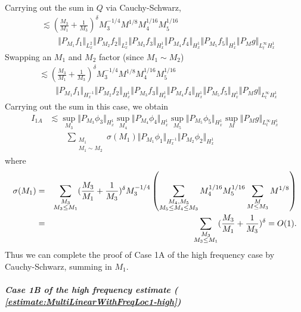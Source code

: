 \documentclass[12pt,letterpaper,leqno]{amsart}
\theoremstyle{plain}
\numberwithin{equation}{section}
\numberwithin{theorem}{section}
\numberwithin{proposition}{section}
\numberwithin{lemma}{section}
\numberwithin{corollary}{section}
\begin{document}
Carrying out the sum in $Q$ via Cauchy-Schwarz, 
\begin{align*}
& \lesssim (\frac{M_{3}}{M_{1}}+\frac{1}{M_{3}})^{\delta
}M_{3}^{-1/4}M^{1/8}M_{4}^{1/16}M_{5}^{1/16} \\
& \qquad \Vert P_{M_{1}}f_{1}\Vert _{L_{x}^{2}}\Vert P_{M_{2}}f_{2}\Vert
_{L_{x}^{2}}\Vert P_{M_{3}}f_{3}\Vert _{H_{x}^{1}}\Vert P_{M_{4}}f_{4}\Vert
_{H_{x}^{1}}\Vert P_{M_{5}}f_{5}\Vert _{H_{x}^{1}}\Vert P_{M}g\Vert
_{L_{t}^{\infty }H_{x}^{1}}
\end{align*}%
Swapping an $M_{1}$ and $M_{2}$ factor (since $M_{1}\sim M_{2}$) 
\begin{align*}
& \lesssim (\frac{M_{3}}{M_{1}}+\frac{1}{M_{3}})^{\delta
}M_{3}^{-1/4}M^{1/8}M_{4}^{1/16}M_{5}^{1/16} \\
& \qquad \Vert P_{M_{1}}f_{1}\Vert _{H_{x}^{-1}}\Vert P_{M_{2}}f_{2}\Vert
_{H_{x}^{1}}\Vert P_{M_{3}}f_{3}\Vert _{H_{x}^{1}}\Vert P_{M_{4}}f_{4}\Vert
_{H_{x}^{1}}\Vert P_{M_{5}}f_{5}\Vert _{H_{x}^{1}}\Vert P_{M}g\Vert
_{L_{t}^{\infty }H_{x}^{1}}
\end{align*}%
Carrying out the sum in this case, we obtain 
\begin{align*}
I_{1A}& \lesssim \sup_{M_{3}}\Vert P_{M_{3}}\phi _{3}\Vert
_{H_{x}^{1}}\sup_{M_{4}}\Vert P_{M_{4}}\phi _{4}\Vert
_{H_{x}^{1}}\sup_{M_{5}}\Vert P_{M_{5}}\phi _{5}\Vert
_{H_{x}^{1}}\sup_{M}\Vert P_{M}g\Vert _{L_{t}^{\infty }H_{x}^{1}} \\
& \qquad \sum_{\substack{ M_{1}  \\ M_{1}\sim M_{2}}}\sigma (M_{1})\Vert
P_{M_{1}}\phi _{1}\Vert _{H_{x}^{-1}}\Vert P_{M_{2}}\phi _{2}\Vert
_{H_{x}^{1}}
\end{align*}%
where%
\begin{eqnarray*}
\sigma (M_{1}) &=&\sum_{\substack{ M_{3}  \\ M_{3}\leq M_{1}}}(\frac{M_{3}}{%
M_{1}}+\frac{1}{M_{3}})^{\delta }M_{3}^{-1/4}\left( \sum_{\substack{ %
M_{4},M_{5}  \\ M_{5}\leq M_{4}\leq M_{3}}}M_{4}^{1/16}M_{5}^{1/16}\sum 
_{\substack{ M  \\ M\leq M_{3}}}M^{1/8}\right) \\
&=&\sum_{\substack{ M_{3}  \\ M_{3}\leq M_{1}}}(\frac{M_{3}}{M_{1}}+\frac{1}{%
M_{3}})^{\delta }=O(1).
\end{eqnarray*}%
Thus we can complete the proof of Case 1A of the high frequency case by
Cauchy-Schwarz, summing in $M_{1}$.

\paragraph{\textit{\noindent Case 1B of the high frequency estimate (\protect
\ref{estimate:MultiLinearWithFreqLoc1-high})}}
\end{document}
